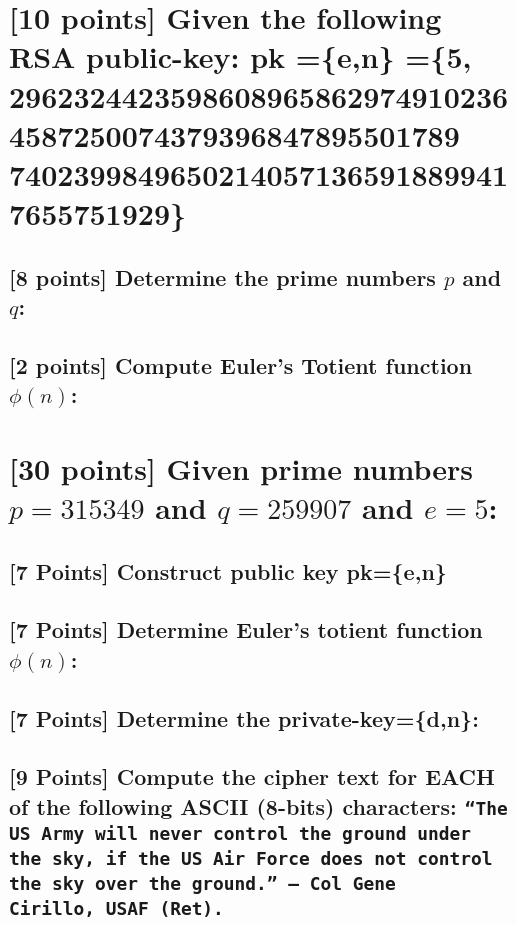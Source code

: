 \documentclass{article}
\begin{document}
\section{[10 points] Given the following RSA public-key: pk =\{e,n\} =\{5, 29623244235986089658629749102364587250074379396847895501789\\
74023998496502140571365918899417655751929\}}
\subsection{[8 points] Determine the prime numbers $p$ and $q$:}
\vspace{.5in}
\subsection{[2 points] Compute Euler's Totient function $\phi(n)$:}
\vspace{.5in}


\section{[30 points] Given prime numbers $p=315349$ and $q=259907$ and $e=5$:}
\subsection{[7 Points] Construct public key pk=\{e,n\}}
\vspace{.5in}

\subsection{[7 Points] Determine Euler's totient function $\phi(n)$:}
\vspace{.5in}


\subsection{[7 Points] Determine the private-key=\{d,n\}:}
\vspace{.5in}

\subsection{[9 Points] Compute the cipher text for EACH of the following ASCII (8-bits) characters: \texttt{``The US Army will never control the ground under the sky, if the US Air Force does not control the sky over the ground.'' -- Col Gene \\Cirillo, USAF (Ret). }}
\vspace{.5in}
\end{document}
